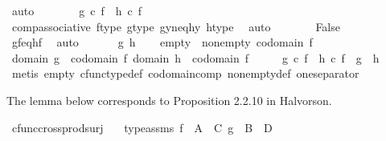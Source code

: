 \begin{isabellebody}
\ auto\isanewline
\ \ \ \ \isamarkupfalse%
\ \isamarkupfalse%
\ {\isachardoublequoteopen}g\ {\isasymcirc}\isactrlsub c\ f\ {\isasymnoteq}\ h\ {\isasymcirc}\isactrlsub c\ f{\isachardoublequoteclose}\isanewline
\ \ \ \ \ \ \isamarkupfalse%
\ comp{\isacharunderscore}{\kern0pt}associative{}\ f{\isacharunderscore}{\kern0pt}type\ g{\isacharunderscore}{\kern0pt}type\ gy{\isacharunderscore}{\kern0pt}neq{\isacharunderscore}{\kern0pt}hy\ h{\isacharunderscore}{\kern0pt}type\ \isamarkupfalse%
\ auto\isanewline
\ \ \ \ \isamarkupfalse%
\ \isamarkupfalse%
\ False\isanewline
\ \ \ \ \ \ \isamarkupfalse%
\ gf{\isacharunderscore}{\kern0pt}eq{\isacharunderscore}{\kern0pt}hf\ \isamarkupfalse%
\ auto\isanewline
\ \ \isamarkupfalse%
\isanewline
{}\isamarkupfalse%
\isanewline
\ \ \isamarkupfalse%
\ g\ h\isanewline
\ \ \isamarkupfalse%
\ empty{\isacharcolon}{\kern0pt}\ {\isachardoublequoteopen}{\isasymnot}\ nonempty\ {\isacharparenleft}{\kern0pt}codomain\ f{\isacharparenright}{\kern0pt}{\isachardoublequoteclose}\isanewline
\ \ \isamarkupfalse%
\ {\isachardoublequoteopen}domain\ g\ {\isacharequal}{\kern0pt}\ codomain\ f{\isachardoublequoteclose}\ {\isachardoublequoteopen}domain\ h\ {\isacharequal}{\kern0pt}\ codomain\ f{\isachardoublequoteclose}\isanewline
\ \ \isamarkupfalse%
\ \isamarkupfalse%
\ {\isachardoublequoteopen}g\ {\isasymcirc}\isactrlsub c\ f\ {\isacharequal}{\kern0pt}\ h\ {\isasymcirc}\isactrlsub c\ f\ {\isasymLongrightarrow}\ g\ {\isacharequal}{\kern0pt}\ h{\isachardoublequoteclose}\isanewline
\ \ \ \ \isamarkupfalse%
\ {\isacharparenleft}{\kern0pt}metis\ empty\ cfunc{\isacharunderscore}{\kern0pt}type{\isacharunderscore}{\kern0pt}def\ codomain{\isacharunderscore}{\kern0pt}comp\ nonempty{\isacharunderscore}{\kern0pt}def\ one{\isacharunderscore}{\kern0pt}separator{\isacharparenright}{\kern0pt}\isanewline
{}\isamarkupfalse%
%
\endisatagproof
{\isafoldproof}%
%
\isadelimproof
%
\endisadelimproof
%
\begin{isamarkuptext}%
The lemma below corresponds to Proposition 2.2.10 in Halvorson.%
\end{isamarkuptext}\isamarkuptrue%
\isamarkupfalse%
\ cfunc{\isacharunderscore}{\kern0pt}cross{\isacharunderscore}{\kern0pt}prod{\isacharunderscore}{\kern0pt}surj{\isacharcolon}{\kern0pt}\isanewline
\ \ \ type{\isacharunderscore}{\kern0pt}assms{\isacharcolon}{\kern0pt}\ {\isachardoublequoteopen}f\ {\isacharcolon}{\kern0pt}\ A\ {\isasymrightarrow}\ C{\isachardoublequoteclose}\ {\isachardoublequoteopen}g\ {\isacharcolon}{\kern0pt}\ B\ {\isasymrightarrow}\ D{\isachardoublequoteclose}\isanewline

\end{isabellebody}
